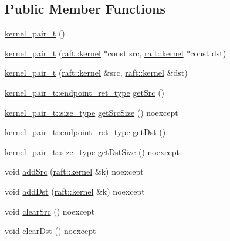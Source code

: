 \subsection*{Public Member Functions}
\begin{DoxyCompactItemize}
\item 
\hyperlink{classkernel__pair__t_a7b3e46fff3f852a76b0af10002eb07f8}{kernel\+\_\+pair\+\_\+t} ()
\item 
\hyperlink{classkernel__pair__t_a61db7ee1e6f651c096af617f4449dd73}{kernel\+\_\+pair\+\_\+t} (\hyperlink{classraft_1_1kernel}{raft\+::kernel} $\ast$const src, \hyperlink{classraft_1_1kernel}{raft\+::kernel} $\ast$const dst)
\item 
\hyperlink{classkernel__pair__t_a1d877d839c148a1adf0d74c2674d6b6d}{kernel\+\_\+pair\+\_\+t} (\hyperlink{classraft_1_1kernel}{raft\+::kernel} \&src, \hyperlink{classraft_1_1kernel}{raft\+::kernel} \&dst)
\item 
\hyperlink{classkernel__pair__t_abc3c7ff96f4f00f4e31c56fb2b7da728}{kernel\+\_\+pair\+\_\+t\+::endpoint\+\_\+ret\+\_\+type} \hyperlink{classkernel__pair__t_a855bdc92268a7836b518a91e05de1f34}{get\+Src} ()
\item 
\hyperlink{classkernel__pair__t_aec4bb36f70893ab1bf0a912e8c3aca2a}{kernel\+\_\+pair\+\_\+t\+::size\+\_\+type} \hyperlink{classkernel__pair__t_a08c5358da2a54295a981f888770baddf}{get\+Src\+Size} () noexcept
\item 
\hyperlink{classkernel__pair__t_abc3c7ff96f4f00f4e31c56fb2b7da728}{kernel\+\_\+pair\+\_\+t\+::endpoint\+\_\+ret\+\_\+type} \hyperlink{classkernel__pair__t_af722fd511f929f0ed3aacd89f1bd9915}{get\+Dst} ()
\item 
\hyperlink{classkernel__pair__t_aec4bb36f70893ab1bf0a912e8c3aca2a}{kernel\+\_\+pair\+\_\+t\+::size\+\_\+type} \hyperlink{classkernel__pair__t_a4560aa51a147dd0cf2dcfab2b23d9cbe}{get\+Dst\+Size} () noexcept
\item 
void \hyperlink{classkernel__pair__t_a73351e6699a9243b48df6492f12c83ad}{add\+Src} (\hyperlink{classraft_1_1kernel}{raft\+::kernel} \&k) noexcept
\item 
void \hyperlink{classkernel__pair__t_ae22da5b3353d0ccc24d88f87506f5ed4}{add\+Dst} (\hyperlink{classraft_1_1kernel}{raft\+::kernel} \&k) noexcept
\item 
void \hyperlink{classkernel__pair__t_a853076440144fbb3c5a3524536a46336}{clear\+Src} () noexcept
\item 
void \hyperlink{classkernel__pair__t_a0b402c8a6d486e713ea98b9dfaf1239a}{clear\+Dst} () noexcept
\end{DoxyCompactItemize}


